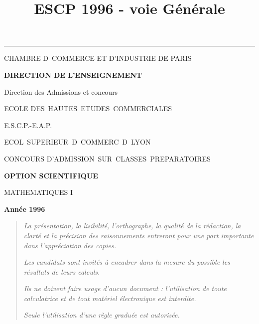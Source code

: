 \documentclass[11pt]{article}%
\title{\bf \vspace{-2cm} ESCP 1996 - voie Générale} %
\author{} %
\date{} %
\begin{document}
\maketitle %
\vspace{-1.4cm}\hrule %
\thispagestyle{fancy}

\vspace*{.2cm}




\begin{center}
{\small CHAMBRE D\E\ COMMERCE ET D'INDUSTRIE DE PARIS}

\textbf{DIRECTION DE L'ENSEIGNEMENT}

Direction des Admissions et concours

\underline{\hspace*{3cm}}

{\Large ECOLE DES\ HAUTES\ ETUDES\ COMMERCIALES}

{\Large E.S.C.P.-E.A.P.}

{\Large ECOL\E\ SUPERIEUR\E\ D\E\ COMMERC\E\ D\E\ LYON}{\large }

CONCOURS D'ADMISSION\ SUR\ CLASSES\ PREPARATOIRES

\underline{\hspace*{3cm}}

\textbf{OPTION SCIENTIFIQUE}

{\Large MATHEMATIQUES I}

\textbf{Année 1996}

\underline{\hspace*{3cm}}
\end{center}

\begin{quotation}
\noindent \textsl{La présentation, la lisibilité, l'orthographe, la
qualité
de la rédaction, la clarté et la précision des raisonnements entreront
pour
une part importante dans l'appréciation des copies.}

\noindent \textsl{Les candidats sont invités à encadrer dans la mesure
du
possible les résultats de leurs calculs.}

\noindent \textsl{Ils ne doivent faire usage d'aucun document :
l'utilisation de toute calculatrice et de tout matériel électronique
est
interdite.}

\noindent \textsl{Seule l'utilisation d'une règle graduée est
autorisée.}

\noindent \textsl{\hrulefill }
\end{quotation}
\end{document}
